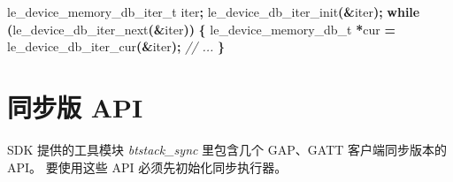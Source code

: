\documentclass[
  12pt,
]{book}
\newenvironment{Shaded}{\begin{snugshade}}{\end{snugshade}}
\newcommand{\CommentTok}[1]{\textcolor[rgb]{0.56,0.35,0.01}{\textit{#1}}}
\newcommand{\ControlFlowTok}[1]{\textcolor[rgb]{0.13,0.29,0.53}{\textbf{#1}}}
\newcommand{\NormalTok}[1]{#1}
\newcommand{\OperatorTok}[1]{\textcolor[rgb]{0.81,0.36,0.00}{\textbf{#1}}}
\begin{document}
\begin{itemize}
\begin{Shaded}
\begin{Highlighting}[]
\NormalTok{le\_device\_memory\_db\_iter\_t iter}\OperatorTok{;}
\NormalTok{le\_device\_db\_iter\_init}\OperatorTok{(\&}\NormalTok{iter}\OperatorTok{);}
\ControlFlowTok{while} \OperatorTok{(}\NormalTok{le\_device\_db\_iter\_next}\OperatorTok{(\&}\NormalTok{iter}\OperatorTok{))}
\OperatorTok{\{}
\NormalTok{    le\_device\_memory\_db\_t }\OperatorTok{*}\NormalTok{cur }\OperatorTok{=}\NormalTok{ le\_device\_db\_iter\_cur}\OperatorTok{(\&}\NormalTok{iter}\OperatorTok{);}
    \CommentTok{// ...}
\OperatorTok{\}}
\end{Highlighting}
\end{Shaded}
\end{itemize}

\hypertarget{ch-misc-synced-api}{%
\section{同步版 API}\label{ch-misc-synced-api}}

SDK 提供的工具模块 \emph{btstack\_sync} 里包含几个 GAP、GATT 客户端同步版本的 API。
要使用这些 API 必须先初始化同步执行器。
\end{document}

